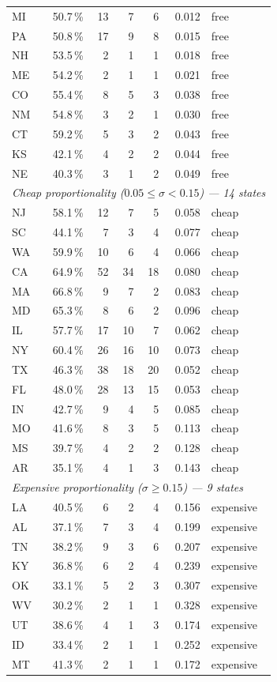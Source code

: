 \begin{longtable}{lrrrrrl}
MI & 50.7\,\% & 13 &  7 &  6 & 0.012 & free \\
PA & 50.8\,\% & 17 &  9 &  8 & 0.015 & free \\
NH & 53.5\,\% &  2 &  1 &  1 & 0.018 & free \\
ME & 54.2\,\% &  2 &  1 &  1 & 0.021 & free \\
CO & 55.4\,\% &  8 &  5 &  3 & 0.038 & free \\
NM & 54.8\,\% &  3 &  2 &  1 & 0.030 & free \\
CT & 59.2\,\% &  5 &  3 &  2 & 0.043 & free \\
KS & 42.1\,\% &  4 &  2 &  2 & 0.044 & free \\
NE & 40.3\,\% &  3 &  1 &  2 & 0.049 & free \\
\midrule
\multicolumn{7}{l}{\textit{Cheap proportionality ($0.05 \leq \sigma < 0.15$) --- 14 states}} \\
NJ & 58.1\,\% & 12 &  7 &  5 & 0.058 & cheap \\
SC & 44.1\,\% &  7 &  3 &  4 & 0.077 & cheap \\
WA & 59.9\,\% & 10 &  6 &  4 & 0.066 & cheap \\
CA & 64.9\,\% & 52 & 34 & 18 & 0.080 & cheap \\
MA & 66.8\,\% &  9 &  7 &  2 & 0.083 & cheap \\
MD & 65.3\,\% &  8 &  6 &  2 & 0.096 & cheap \\
IL & 57.7\,\% & 17 & 10 &  7 & 0.062 & cheap \\
NY & 60.4\,\% & 26 & 16 & 10 & 0.073 & cheap \\
TX & 46.3\,\% & 38 & 18 & 20 & 0.052 & cheap \\
FL & 48.0\,\% & 28 & 13 & 15 & 0.053 & cheap \\
IN & 42.7\,\% &  9 &  4 &  5 & 0.085 & cheap \\
MO & 41.6\,\% &  8 &  3 &  5 & 0.113 & cheap \\
MS & 39.7\,\% &  4 &  2 &  2 & 0.128 & cheap \\
AR & 35.1\,\% &  4 &  1 &  3 & 0.143 & cheap \\
\midrule
\multicolumn{7}{l}{\textit{Expensive proportionality ($\sigma \geq 0.15$) --- 9 states}} \\
LA & 40.5\,\% &  6 &  2 &  4 & 0.156 & expensive \\
AL & 37.1\,\% &  7 &  3 &  4 & 0.199 & expensive \\
TN & 38.2\,\% &  9 &  3 &  6 & 0.207 & expensive \\
KY & 36.8\,\% &  6 &  2 &  4 & 0.239 & expensive \\
OK & 33.1\,\% &  5 &  2 &  3 & 0.307 & expensive \\
WV & 30.2\,\% &  2 &  1 &  1 & 0.328 & expensive \\
UT & 38.6\,\% &  4 &  1 &  3 & 0.174 & expensive \\
ID & 33.4\,\% &  2 &  1 &  1 & 0.252 & expensive \\
MT & 41.3\,\% &  2 &  1 &  1 & 0.172 & expensive \\
\end{longtable}


